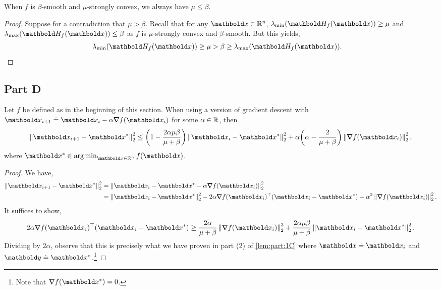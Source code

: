 \documentclass{tufte-handout}
\begin{document}
\begin{lem}
When $f$ is $\beta$-smooth and $\mu$-strongly convex, we always have $\mu \leq \beta$.
\end{lem} \begin{proof}
Suppose for a contradiction that $\mu > \beta$. Recall that for any $\vx \in \R^n$, $\lmin(\mH_f(\vx)) \geq \mu$ and $\lmax(\mH_f(\vx)) \leq \beta$ as $f$ is $\mu$-strongly convex and $\beta$-smooth. But this yields, \begin{align*}
    \lmin(\mH_f(\vx)) \geq \mu > \beta \geq \lmax(\mH_f(\vx)). &\qedhere
\end{align*}
\end{proof}

\subsection{Part D}
\begin{lem}\label{lem:part:1D}
Let $f$ be defined as in the beginning of this section. When using a version of gradient descent with $\vx_{i+1} \defeq \vx_i - \alpha \grad f(\vx_i)$ for some $\alpha \in \mathbb{R}$, then \begin{align}
    \norm{\vx_{i+1} - \s{\vx}}_2^2 \leq \parentheses*{1-\frac{2\alpha\mu\beta}{\mu + \beta}}\norm{\vx_i - \s{\vx}}_2^2 + \alpha\parentheses*{\alpha - \frac{2}{\mu + \beta}}\norm{\grad f(\vx_i)}_2^2, \label{eq:part:1D}
\end{align} where $\s{\vx} \in \argmin_{\vx \in \R^n} f(\vx)$.
\end{lem}
\begin{proof} We have, \begin{align*}
    \norm{\vx_{i+1} - \s{\vx}}_2^2 &= \norm{\vx_i - \s{\vx} - \alpha \grad f(\vx_i)}_2^2 \\
    &= \norm{\vx_i - \s{\vx}}_2^2 - 2\alpha\trans{\grad f(\vx_i)}(\vx_i - \s{\vx}) + \alpha^2\norm{\grad f(\vx_i)}_2^2.
\end{align*} It suffices to show, \begin{align*}
    2\alpha\trans{\grad f(\vx_i)}(\vx_i - \s{\vx}) \geq \frac{2\alpha}{\mu + \beta}\norm{\grad f(\vx_i)}_2^2 + \frac{2\alpha\mu\beta}{\mu + \beta}\norm{\vx_i - \s{\vx}}_2^2.
\end{align*} Dividing by $2\alpha$, observe that this is precisely what we have proven in part (2) of \cref{lem:part:1C} where $\vx \defeq \vx_i$ and $\vy \defeq \s{\vx}$.\footnote{Note that $\grad f(\s{\vx}) = 0$.}
\end{proof}
\end{document}
